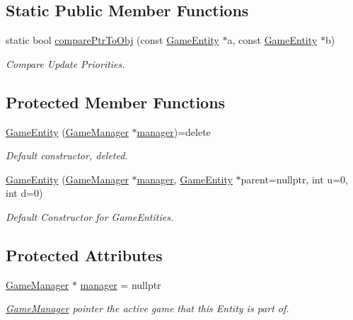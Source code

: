 \subsection*{Static Public Member Functions}
\begin{DoxyCompactItemize}
\item 
static bool \mbox{\hyperlink{class_game_entity_ac25fe26d4c9c0240438c133d99e626b0}{compare\+Ptr\+To\+Obj}} (const \mbox{\hyperlink{class_game_entity}{Game\+Entity}} $\ast$a, const \mbox{\hyperlink{class_game_entity}{Game\+Entity}} $\ast$b)
\begin{DoxyCompactList}\small\item\em Compare Update Priorities. \end{DoxyCompactList}\end{DoxyCompactItemize}
\subsection*{Protected Member Functions}
\begin{DoxyCompactItemize}
\item 
\mbox{\hyperlink{class_game_entity_ae74835425142887619b13b9c11ea35f1}{Game\+Entity}} (\mbox{\hyperlink{class_game_manager}{Game\+Manager}} $\ast$\mbox{\hyperlink{class_game_entity_a1771f6e83f237a25fe370dd3a926cfb1}{manager}})=delete
\begin{DoxyCompactList}\small\item\em Default constructor, deleted. \end{DoxyCompactList}\item 
\mbox{\hyperlink{class_game_entity_a49861d170270b2c4caeec0a058f52c7e}{Game\+Entity}} (\mbox{\hyperlink{class_game_manager}{Game\+Manager}} $\ast$\mbox{\hyperlink{class_game_entity_a1771f6e83f237a25fe370dd3a926cfb1}{manager}}, \mbox{\hyperlink{class_game_entity}{Game\+Entity}} $\ast$parent=nullptr, int u=0, int d=0)
\begin{DoxyCompactList}\small\item\em Default Constructor for Game\+Entities. \end{DoxyCompactList}\end{DoxyCompactItemize}
\subsection*{Protected Attributes}
\begin{DoxyCompactItemize}
\item 
\mbox{\label{class_game_entity_a1771f6e83f237a25fe370dd3a926cfb1}} 
\mbox{\hyperlink{class_game_manager}{Game\+Manager}} $\ast$ \mbox{\hyperlink{class_game_entity_a1771f6e83f237a25fe370dd3a926cfb1}{manager}} = nullptr
\begin{DoxyCompactList}\small\item\em \mbox{\hyperlink{class_game_manager}{Game\+Manager}} pointer the active game that this Entity is part of. \end{DoxyCompactList}\end{DoxyCompactItemize}
